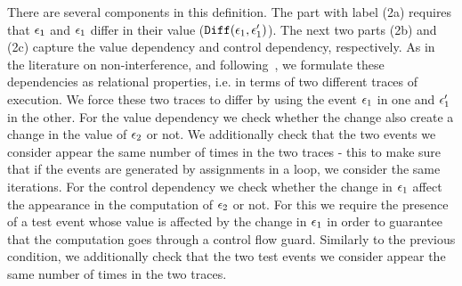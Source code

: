 There are several components in this definition. The part with label (2a) requires that $\mathtt{\epsilon}_1$ and $\mathtt{\epsilon}_1$ differ in their value ($\mathtt{Diff}(\mathtt{\epsilon}_1, \mathtt{\epsilon}_1')$).
The next two parts (2b) and (2c) capture the value dependency and control dependency, respectively.
As in the literature on non-interference, and following~\cite{Cousot19a}, we formulate these dependencies as relational properties, i.e. in terms of two different traces of execution. 
We force these two traces to differ by using the event $\mathtt{\epsilon}_1$ in one and $\mathtt{\epsilon}_1'$ in the other. 
For the value dependency we check whether the change also create a change in the value of $\mathtt{\epsilon}_2$ or not. We additionally check that the two events we consider appear the same number of times in the two traces - this to make sure that if the events are generated by assignments in a loop, we consider the same iterations. 
For the control dependency we check whether the change in $\mathtt{\epsilon}_1$ affect the appearance in the computation of $\mathtt{\epsilon}_2$ or not. 
For this we require the presence of a test event whose value is affected by the change in $\mathtt{\epsilon}_1$
in order to guarantee that the computation goes through a control flow guard.
Similarly to the previous condition, we additionally check that the two test events we consider appear the same number of times in the two traces.


